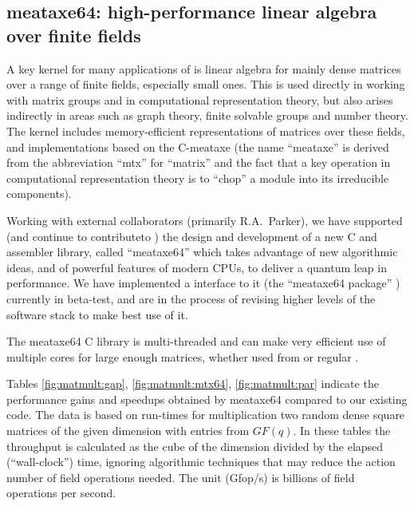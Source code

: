 \documentclass{deliverablereport}
\begin{document}



\subsection{meataxe64: high-performance linear algebra over finite fields}\label{meataxe64}

A key kernel for many applications of \GAP is linear algebra for
mainly dense matrices over
a range of finite fields, especially small ones. This is used directly in working with
matrix groups and in computational representation theory, but also
arises indirectly in areas such as graph theory, finite solvable
groups and number theory.  The \GAP kernel includes memory-efficient
representations of matrices over these fields, and implementations
based on the C-meataxe (the name ``meataxe'' is derived from the
abbreviation ``mtx'' for ``matrix'' and the fact that a key operation
in computational representation theory is to ``chop'' a module into
its irreducible components).

Working with external collaborators (primarily R.A.~Parker),
we have supported (and continue to contributeto ) the design and development 
of a new C and
assembler library, called ``meataxe64'' which takes
advantage of new algorithmic ideas, and of powerful features of modern
CPUs, to deliver a quantum leap in performance. We have implemented a
\GAP interface to it (the ``meataxe64 \GAP package'' \cite{meataxe64}) currently in
beta-test, and are in the process of revising higher levels of the software stack to make best
use of it.

The meataxe64 C library is multi-threaded and can make very efficient
use of multiple cores for large enough matrices, whether used from
\HPCGAP or regular \GAP.

Tables \ref{fig:matmult:gap}, \ref{fig:matmult:mtx64},
\ref{fig:matmult:par} indicate the performance gains and
speedups obtained by meataxe64 compared to our existing code.  The
data is based on run-times for multiplication two random dense
square matrices of the given dimension with entries from $GF(q)$. In
these tables the throughput is calculated as the cube of the dimension
divided by the elapsed (``wall-clock'') time, ignoring algorithmic
techniques that may reduce the action number of field operations
needed. The unit (Gfop/s) is billions of field operations per second.
\end{document}
